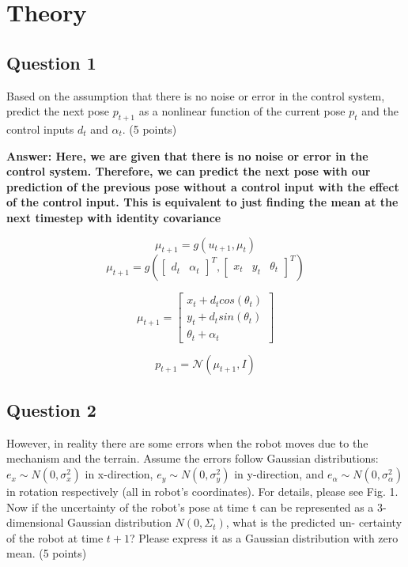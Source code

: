 \documentclass[12pt, a4paper]{article}
\begin{document}
\section{Theory}
\subsection{Question 1}
Based on the assumption that there is no noise or error in the control system,
predict the next pose $p_{t+1}$ as a nonlinear function of the current pose $p_t$ and
the control inputs $d_t$ and $\alpha_t$. (5 points)

\textbf{Answer: Here, we are given that there is no noise or error in the control system. Therefore, we can predict the next pose with our prediction of the previous pose without a control input with the effect of the control input. This is equivalent to just finding the mean at the next timestep with identity covariance}

$$\mu_{t+1} = g(u_{t+1}, \mu_{t})$$
$$\mu_{t+1} = g(
\begin{bmatrix} 
    d_t & \alpha_t
\end{bmatrix}^T
, 
\begin{bmatrix}
    x_t & y_t & \theta_t
\end{bmatrix}^T)$$

$$\mu_{t+1} = \begin{bmatrix}
    x_t + d_t cos(\theta_t) \\
    y_t + d_t sin(\theta_t)\\
    \theta_t + \alpha_t
\end{bmatrix}$$

$$p_{t+1} = \mathcal{N}(\mu_{t+1}, I)$$



\subsection{Question 2}
However, in reality there are some errors when the robot moves due to the
mechanism and the terrain. Assume the errors follow Gaussian distributions:
$e_x \sim N(0, \sigma^2_x)$ in x-direction,
$e_y \sim N (0, \sigma^2_y)$ in y-direction, and 
$e_{\alpha} \sim N (0, \sigma^2_{\alpha})$
in rotation respectively (all in robot’s coordinates). For details, please see
Fig. 1. Now if the uncertainty of the robot’s pose at time t can be represented
as a 3-dimensional Gaussian distribution $N (0, \Sigma_t)$, what is the predicted un-
certainty of the robot at time $t+1$? Please express it as a Gaussian distribution
with zero mean. (5 points)
\end{document}
